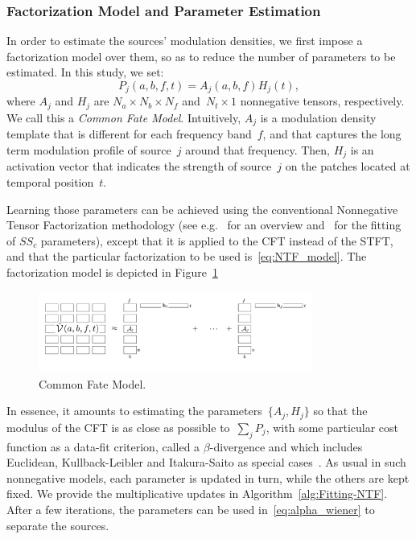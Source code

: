 {{\subsubsection{Factorization Model and Parameter Estimation}
\label{sub:NTF}

In order to estimate the sources' modulation densities, we first impose
a factorization model over them, so as to reduce the number of parameters
to be estimated. In this study, we set:
\begin{equation}
P_{j}\left(a,b,f,t\right)=A_{j}\left(a,b,f\right)H_{j}\left(t\right),\label{eq:NTF_model}
\end{equation}
where $A_{j}$ and $H_{j}$ are $N_{a}\times N_{b}\times N_{f}$ and~$N_{t}\times1$
nonnegative tensors, respectively. We call this a \emph{Common Fate
Model}. Intuitively, $A_{j}$ is a modulation density template that
is different for each frequency band~$f$, and that captures the
long term modulation profile of source~$j$ around that frequency.
Then, $H_{j}$ is an activation vector that indicates the strength
of source~$j$ on the patches located at temporal position~$t$.



Learning those parameters can be achieved using the conventional Nonnegative
Tensor Factorization methodology (see e.g.~\cite{cichoki09,ozerov12,smaragdis14}
for an overview and~\cite{liutkus15b} for the fitting of $S S_{c}$
parameters), except that it is applied to the CFT instead of the STFT,
and that the particular factorization to be used is~\eqref{eq:NTF_model}.
The factorization model is depicted in Figure~\ref{fig:cfm}

\begin{figure}[h]
\centering
\includegraphics[width=0.8\textwidth]{Chapters/06_Separation_Unknown/figures/cfm.pdf}
\caption{Common Fate Model.}
\label{fig:cfm}
\end{figure}

In essence, it amounts to estimating the parameters~$\{ A_{j},H_{j}\} $
so that the modulus of the CFT is
as close as possible to~$\sum_{j}P_{j}$, with some particular
cost function as a data-fit criterion, called a $\beta$-divergence
and which includes Euclidean, Kullback-Leibler and Itakura-Saito as
special cases~\cite{fitzgerald08a}. As usual in such nonnegative models,
each parameter is updated in turn, while the others are kept fixed.
We provide the multiplicative updates in Algorithm~\ref{alg:Fitting-NTF}.
After a few iterations, the parameters can be used in~\eqref{eq:alpha_wiener} to separate
the sources.

}}
